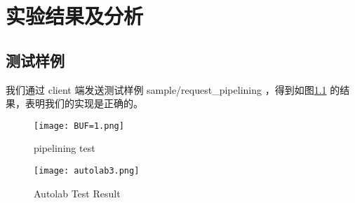 

\chapter{实验结果及分析}

\section{测试样例}
我们通过 client 端发送测试样例 sample/request\_pipelining ，得到如图\ref{fig:pipelining} 的结果，表明我们的实现是正确的。


\begin{figure}[htbp!]
    \centering 
    \texttt{[image: BUF=1.png]}
    \caption{pipelining test}
    \label{fig:pipelining}
\end{figure}

\begin{figure}[htbp!]
    \centering
    \texttt{[image: autolab3.png]}
    \caption{Autolab Test Result}\label{fig:autolab3}
\end{figure}